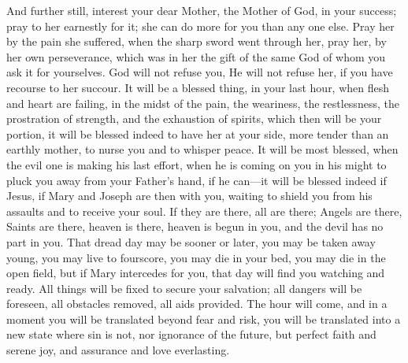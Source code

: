 And further still, interest your dear Mother, the Mother of God, in
your success; pray to her earnestly for it; she can do more for you
than any one else. Pray her by the pain she suffered, when the sharp
sword went through her, pray her, by her own perseverance, which was
in her the gift of the same God of whom you ask it for yourselves. God
will not refuse you, He will not refuse her, if you have recourse to
her succour. It will be a blessed thing, in your last hour, when flesh
and heart are failing, in the midst of the pain, the weariness, the
restlessness, the prostration of strength, and the exhaustion of
spirits, which then will be your portion, it will be blessed indeed to
have her at your side, more tender than an earthly mother, to nurse
you and to whisper peace. It will be most blessed, when the evil one
is making his last effort, when he is coming on you in his might to
pluck you away from your Father's hand, if he can—it will be blessed
indeed if Jesus, if Mary and Joseph are then with you, waiting to
shield you from his assaults and to receive your soul. If they are
there, all are there; Angels are there, Saints are there, heaven is
there, heaven is begun in you, and the devil has no part in you. That
dread day may be sooner or later, you may be taken away young, you may
live to fourscore, you may die in your bed, you may die in the open
field, but if Mary intercedes for you, that day will find you watching
and ready. All things will be fixed to secure your salvation; all
dangers will be foreseen, all obstacles removed, all aids provided.
The hour will come, and in a moment you will be translated beyond fear
and risk, you will be translated into a new state where sin is not,
nor ignorance of the future, but perfect faith and serene joy, and
assurance and love everlasting.


